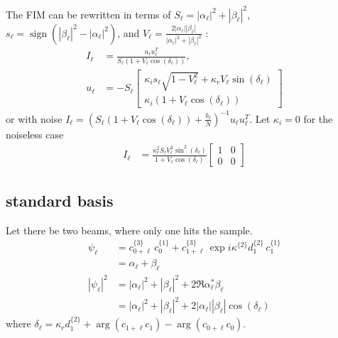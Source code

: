 \documentclass[12pt]{article}
\DeclareMathOperator{\sign}{sign}
\begin{document}
The FIM can be rewritten in terms of $S_\ell = |\alpha_\ell|^2+|\beta_\ell|^2$, 
$s_\ell =\sign(|\beta_\ell|^2 - |\alpha_\ell|^2)$, and 
$V_\ell = \frac{2|\alpha_\ell||\beta_\ell|}{|\alpha_\ell|^2+|\beta_\ell|^2}$ :
\begin{align*}
    I_\ell &= \frac{u_\ell u_\ell^T}{S_\ell (1+V_\ell \cos(\delta_\ell))}, \\
    u_\ell &= -S_\ell \begin{bmatrix}
        \kappa_i s_\ell\sqrt{1-V_\ell^2} + \kappa_r V_\ell \sin(\delta_\ell) \\
        \kappa_i (1+V_\ell \cos(\delta_\ell))
    \end{bmatrix}
\end{align*}
or with noise $I_\ell = (S_\ell (1+V_\ell \cos(\delta_\ell)) + \frac{b_\ell}{N})^{-1} u_\ell u_\ell^T$.
Let $\kappa_i = 0$ for the noiseless case
\begin{align*}
    I_\ell &= \frac{\kappa_r^2 S_\ell V_\ell^2 \sin^2(\delta_\ell)}{1+V_\ell \cos(\delta_\ell)}
    \begin{bmatrix}
        1 & 0 \\
        0 & 0
    \end{bmatrix}
\end{align*}


\subsection{standard basis}
Let there be two beams, where only one hits the sample.
\begin{align*}
    \psi_\ell &= 
    c^{\{3\}}_{0 + \ell} \, 
    c^{\{1\}}_0 
    + c^{\{3\}}_{1 + \ell} \,
        \exp{i \kappa^{\{2\}} d^{\{2\}}_1} \,
        c^{\{1\}}_1 \\
        &= \alpha_\ell + \beta_\ell\\
    |\psi_\ell|^2 &= |\alpha_\ell|^2 + |\beta_\ell|^2 + 2\Re{\alpha_\ell^* \beta_\ell}\\
    &= |\alpha_\ell|^2 + |\beta_\ell|^2 + 2|\alpha_\ell||\beta_\ell|\cos(\delta_\ell)
\end{align*}
where $\delta_\ell = \kappa_r d^{\{2\}}_1 + \arg(c_{1+\ell} c_{1}) - \arg(c_{0+\ell} c_{0})$.
\end{document}
